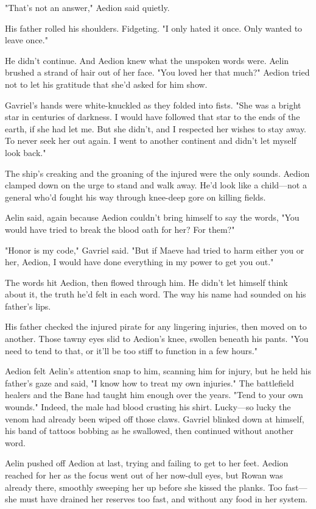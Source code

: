 "That's not an answer," Aedion said quietly.

His father rolled his shoulders. Fidgeting. "I only hated it once. Only wanted to leave once."

He didn't continue. And Aedion knew what the unspoken words were. Aelin brushed a strand of hair out of her face. "You loved her that much?" Aedion tried not to let his gratitude that she'd asked for him show.

Gavriel's hands were white-knuckled as they folded into fists. "She was a bright star in centuries of darkness. I would have followed that star to the ends of the earth, if she had let me. But she didn't, and I respected her wishes to stay away. To never seek her out again. I went to another continent and didn't let myself look back."

The ship's creaking and the groaning of the injured were the only sounds. Aedion clamped down on the urge to stand and walk away. He'd look like a child---not a general who'd fought his way through knee-deep gore on killing fields.

Aelin said, again because Aedion couldn't bring himself to say the words, "You would have tried to break the blood oath for her? For them?"

"Honor is my code," Gavriel said. "But if Maeve had tried to harm either you or her, Aedion, I would have done everything in my power to get you out."

The words hit Aedion, then flowed through him. He didn't let himself think about it, the truth he'd felt in each word. The way his name had sounded on his father's lips.

His father checked the injured pirate for any lingering injuries, then moved on to another. Those tawny eyes slid to Aedion's knee, swollen beneath his pants. "You need to tend to that, or it'll be too stiff to function in a few hours."

Aedion felt Aelin's attention snap to him, scanning him for injury, but he held his father's gaze and said, "I know how to treat my own injuries." The battlefield healers and the Bane had taught him enough over the years. "Tend to your own wounds." Indeed, the male had blood crusting his shirt. Lucky---so lucky the venom had already been wiped off those claws. Gavriel blinked down at himself, his band of tattoos bobbing as he swallowed, then continued without another word.

Aelin pushed off Aedion at last, trying and failing to get to her feet. Aedion reached for her as the focus went out of her now-dull eyes, but Rowan was already there, smoothly sweeping her up before she kissed the planks. Too fast--- she must have drained her reserves too fast, and without any food in her system.

